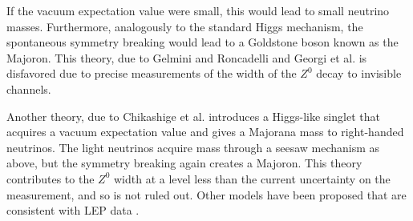 \documentclass[herrin-thesis.tex]{subfiles}
\begin{document}
If the vacuum expectation value were small, this would lead to small neutrino masses. Furthermore, analogously to the standard Higgs mechanism, the spontaneous symmetry breaking would lead to a Goldstone boson known as the Majoron. This theory, due to Gelmini and Roncadelli \cite{Gelmini:1981uq} and Georgi et al. \cite{Georgi:1981kx} is disfavored due to precise measurements of the width of the \(Z^{0}\) decay to invisible channels.

Another theory, due to Chikashige et al. \cite{Chikashige:1981vn} introduces a Higgs-like singlet that acquires a vacuum expectation value and gives a Majorana mass to right-handed neutrinos. The light neutrinos acquire mass through a seesaw mechanism as above, but the symmetry breaking again creates a Majoron. This theory contributes to the \(Z^{0}\) width at a level less than the current uncertainty on the measurement, and so is not ruled out. Other models have been proposed that are consistent with LEP data \cite{Berezhiani199299,Bamert:1995fk}.
\end{document}

